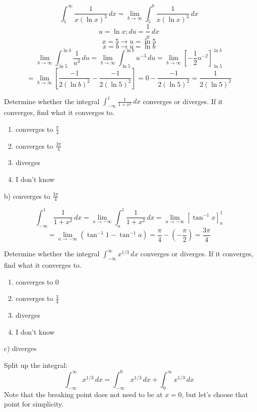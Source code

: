 \documentclass[addpoints,12pt,answers]{exam}
\begin{document}
\begin{questions}
\begin{solution}
    $$\int_5^\infty\frac{1}{x(\ln x)^3}\,dx=\lim_{b\to\infty}\int_5^b\frac{1}{x(\ln x)^3}\,dx$$
    $$u=\ln x; du=\frac{1}{x}\,dx$$
    $$x=5\rightarrow u=\ln 5$$
    $$x=b\rightarrow u=\ln b$$
    $$\lim_{b\to\infty}\int_{\ln 5}^{\ln b}\frac{1}{u^3}\,du=\lim_{b\to\infty}\int_{\ln 5}^{\ln b}u^{-3}\,du=\lim_{b\to\infty}\left[-\frac{1}{2}u^{-2}\right]_{\ln 5}^{\ln b}$$
    $$=\lim_{b\to\infty}\left[\frac{-1}{2(\ln b)^2}-\frac{-1}{2(\ln 5)^2}\right]=0-\frac{-1}{2(\ln 5)^2}=\frac{1}{2(\ln 5)^2}$$
  \end{solution}
  \newpage
  \question
  Determine whether the integral $\displaystyle\int_{-\infty}^1\frac{1}{1+x^2}\,dx$ converges or diverges. If it converges, find what it converges to.
  \begin{enumerate}[label=\alph*)]
    \item
    converges to $\displaystyle\frac{\pi}{4}$
    \item
    converges to $\displaystyle\frac{3\pi}{4}$
    \item
    diverges
    \item
    I don't know
  \end{enumerate}
  \begin{solution}
    b) converges to $\displaystyle\frac{3\pi}{4}$
    
    $$\int_{-\infty}^1\frac{1}{1+x^2}\,dx=\lim_{a\to -\infty}\int_a^1\frac{1}{1+x^2}\,dx=\lim_{a\to -\infty}\left[\tan^{-1}x\right]_a^1$$
    $$=\lim_{a\to -\infty}(\tan^{-1}1-\tan^{-1}a)=\frac{\pi}{4}-\left(-\frac{\pi}{2}\right)=\frac{3\pi}{4}$$
  \end{solution}
  \newpage
  \question
  Determine whether the integral $\displaystyle\int_{-\infty}^\infty x^{1/3}\,dx$ converges or diverges. If it converges, find what it converges to.
  \begin{enumerate}[label=\alph*)]
    \item
    converges to 0
    \item
    converges to $\displaystyle\frac{3}{4}$
    \item
    diverges
    \item
    I don't know
  \end{enumerate}
  \begin{solution}
    c) diverges
    
    Split up the integral:
    $$\int_{-\infty}^\infty x^{1/3}\,dx=\int_{-\infty}^0 x^{1/3}\,dx+\int_0^\infty x^{1/3}\,dx$$
    Note that the breaking point does not need to be at $x=0$, but let's choose that point for simplicity.
    

\end{solution}
\end{questions}
\end{document}
